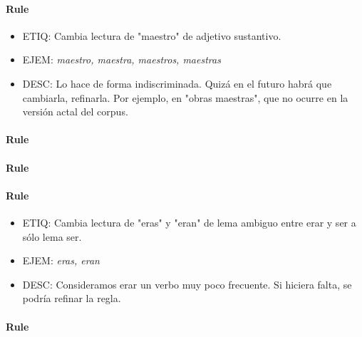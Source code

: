 \documentclass[11pt]{report}
\begin{document}
\paragraph*{Rule}
\begin{itemize}
\item ETIQ: Cambia lectura de "maestro" de adjetivo sustantivo.
\item EJEM: \emph{maestro, maestra, maestros, maestras} 
\item DESC: Lo hace de forma indiscriminada. Quizá en el futuro habrá que cambiarla, refinarla. Por ejemplo, en "obras maestras", que no ocurre en la versión actal del corpus.
\end{itemize}

\paragraph*{Rule}
\paragraph*{Rule}
\paragraph*{Rule}
\begin{itemize}
\item ETIQ: Cambia lectura de "eras" y "eran" de lema ambiguo entre erar y ser a sólo lema ser.
\item EJEM: \emph{eras, eran} 
\item DESC: Consideramos erar un verbo muy poco frecuente. Si hiciera falta, se podría refinar la regla.
\end{itemize}

\paragraph*{Rule}
\end{document}
